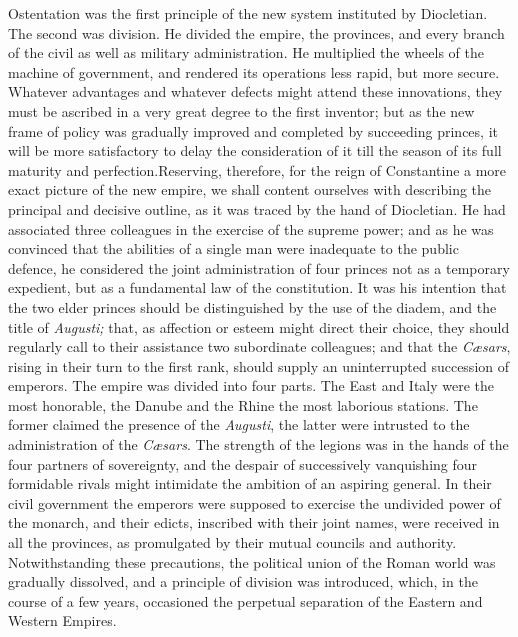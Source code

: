

Ostentation was the first principle of the new system instituted
by Diocletian. The second was division. He divided the empire,
the provinces, and every branch of the civil as well as military
administration. He multiplied the wheels of the machine of
government, and rendered its operations less rapid, but more
secure. Whatever advantages and whatever defects might attend
these innovations, they must be ascribed in a very great degree
to the first inventor; but as the new frame of policy was
gradually improved and completed by succeeding princes, it will
be more satisfactory to delay the consideration of it till the
season of its full maturity and perfection.\footnotemark[103] Reserving,
therefore, for the reign of Constantine a more exact picture of
the new empire, we shall content ourselves with describing the
principal and decisive outline, as it was traced by the hand of
Diocletian. He had associated three colleagues in the exercise of
the supreme power; and as he was convinced that the abilities of
a single man were inadequate to the public defence, he considered
the joint administration of four princes not as a temporary
expedient, but as a fundamental law of the constitution. It was
his intention that the two elder princes should be distinguished
by the use of the diadem, and the title of \textit{Augusti;} that, as
affection or esteem might direct their choice, they should
regularly call to their assistance two subordinate colleagues;
and that the \textit{Cæsars}, rising in their turn to the first rank,
should supply an uninterrupted succession of emperors. The empire
was divided into four parts. The East and Italy were the most
honorable, the Danube and the Rhine the most laborious stations.
The former claimed the presence of the \textit{Augusti}, the latter were
intrusted to the administration of the \textit{Cæsars}. The strength of
the legions was in the hands of the four partners of sovereignty,
and the despair of successively vanquishing four formidable
rivals might intimidate the ambition of an aspiring general. In
their civil government the emperors were supposed to exercise the
undivided power of the monarch, and their edicts, inscribed with
their joint names, were received in all the provinces, as
promulgated by their mutual councils and authority.
Notwithstanding these precautions, the political union of the
Roman world was gradually dissolved, and a principle of division
was introduced, which, in the course of a few years, occasioned
the perpetual separation of the Eastern and Western Empires.


